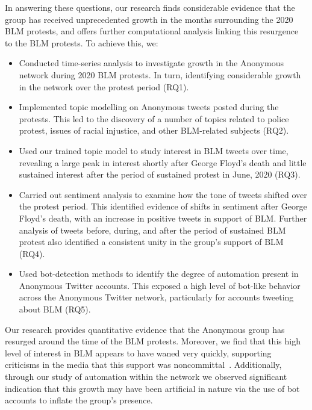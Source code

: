 \documentclass[letterpaper]{article}
\begin{document}
In answering these questions, our research finds considerable evidence that the group has received unprecedented growth in the months surrounding the 2020 BLM protests, and offers further computational analysis linking this resurgence to the BLM protests. To achieve this, we:

\begin{itemize}
\item Conducted time-series analysis to investigate growth in the Anonymous network during 2020 BLM protests. In turn, identifying considerable growth in the network over the protest period (RQ1).

\item Implemented topic modelling on Anonymous tweets posted during the protests. This led to the discovery of a number of topics related to police protest, issues of racial injustice, and other BLM-related subjects (RQ2).

\item Used our trained topic model to study interest in BLM tweets over time, revealing a large peak in interest shortly after George Floyd's death and little sustained interest after the period of sustained protest in June, 2020 (RQ3).

\item Carried out sentiment analysis to examine how the tone of tweets shifted over the protest period. This identified evidence of shifts in sentiment after George Floyd's death, with an increase in positive tweets in support of BLM. Further analysis of tweets before, during, and after the period of sustained BLM protest also identified a consistent unity in the group's support of BLM (RQ4).

\item Used bot-detection methods to identify the degree of automation present in Anonymous Twitter accounts. This exposed a high level of bot-like behavior across the Anonymous Twitter network, particularly for accounts tweeting about BLM (RQ5).
\end{itemize}

Our research provides quantitative evidence that the Anonymous group has resurged around the time of the BLM protests. Moreover, we find that this high level of interest in BLM appears to have waned very quickly, supporting criticisms in the media that this support was noncommittal~\cite{Telegraph2020}. Additionally, through our study of automation within the network we observed significant indication that this growth may have been artificial in nature via the use of bot accounts to inflate the group's presence.
\end{document}
